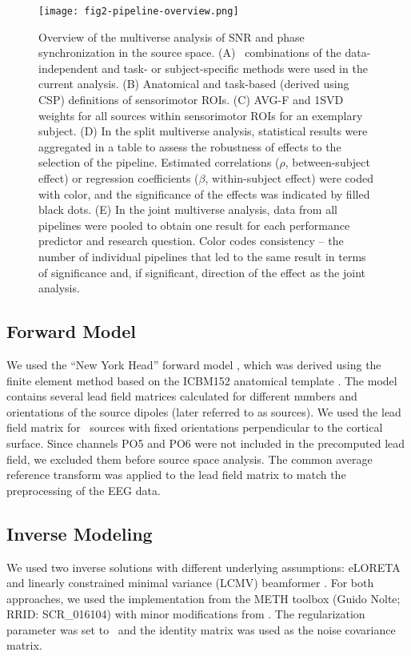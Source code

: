 \begin{figure}[htbp]
    \centering
    \texttt{[image: fig2-pipeline-overview.png]}
    \caption{Overview of the multiverse analysis of SNR and phase synchronization in the source space. (A) \numPipelines~combinations of the data-independent and task- or subject-specific methods were used in the current analysis. (B) Anatomical and task-based (derived using CSP) definitions of sensorimotor ROIs. (C) AVG-F and 1SVD weights for all sources within sensorimotor ROIs for an exemplary subject. (D) In the split multiverse analysis, statistical results were aggregated in a table to assess the robustness of effects to the selection of the pipeline. Estimated correlations ($\rho$, between-subject effect) or regression coefficients ($\beta$, within-subject effect) were coded with color, and the significance of the effects was indicated by filled black dots. (E) In the joint multiverse analysis, data from all pipelines were pooled to obtain one result for each performance predictor and research question. Color codes consistency -- the number of individual pipelines that led to the same result in terms of significance and, if significant, direction of the effect as the joint analysis.}
    \label{fig:pipeline_overview}
\end{figure}

\subsection{Forward Model}

We used the ``New York Head'' forward model \citep{Huang2016NYHead}, which was derived using the finite element method based on the ICBM152 anatomical template \citep{Fonov2009, Fonov2011}. The model contains several lead field matrices calculated for different numbers and orientations of the source dipoles (later referred to as sources). We used the lead field matrix for \numVoxels~sources with fixed orientations perpendicular to the cortical surface. Since channels PO5 and PO6 were not included in the precomputed lead field, we excluded them before source space analysis. The common average reference transform was applied to the lead field matrix to match the preprocessing of the EEG data.

\subsection{Inverse Modeling}

We used two inverse solutions with different underlying assumptions: eLORETA \citep{eLORETA_PascualMarqui2007} and linearly constrained minimal variance (LCMV) beamformer \citep{LCMV_VanVeen1997}. For both approaches, we used the implementation from the METH toolbox (Guido Nolte; RRID: SCR\_016104) with minor modifications from \citep{HaufeEwald2019}. The regularization parameter was set to \inverseRegFactor~and the identity matrix was used as the noise covariance matrix. 

